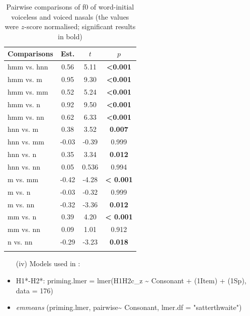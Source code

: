 \documentclass[output=paper]{langscibook}
\begin{document}
\begin{paperappendix}
\begin{table}[H]
	\robustify{\bfseries}
	\begin{tabular}{l S[table-format=-1.2] S[table-format=-1.2] S[table-format=<1.3]}
		\lsptoprule
		Comparisons & {Est.} & {$t$} & {$p$}\\\midrule
		hmm vs. hnn & 0.56 & 5.11 & \bfseries <0.001\\
		hmm vs. m & 0.95 & 9.30 & \bfseries <0.001\\
		hmm vs. mm & 0.52 & 5.24 & \bfseries <0.001\\
		hmm vs. n & 0.92 & 9.50 & \bfseries <0.001\\
		hmm vs. nn & 0.62 & 6.33 & \bfseries <0.001\\
		hnn vs. m & 0.38 & 3.52 & \bfseries 0.007\\
		hnn vs. mm & -0.03 & -0.39 & 0.999\\
		hnn vs. n & 0.35 & 3.34 & \bfseries 0.012\\
		hnn vs. nn & 0.05 & 0.536 & 0.994\\
		m vs. mm & -0.42 & -4.28 & \bfseries < 0.001\\
		m vs. n & -0.03 & -0.32 & 0.999\\
		m vs. nn & -0.32 & -3.36 & \bfseries 0.012\\
		mm vs. n & 0.39 & 4.20 & \bfseries < 0.001\\
		mm vs. nn & 0.09 & 1.01 & 0.912\\
		n vs. nn & -0.29 & -3.23 & \bfseries 0.018\\
		\lspbottomrule
	\end{tabular}
	\caption{Pairwise comparisons of f0 of word-initial voiceless and voiced nasals (the values were $z$-score normalised; significant results in bold)}
	\label{tab:13:sm3}
\end{table}

\clearpage
\begin{itemize}
\item[(iv)] Models used in :
\item
H1*-H2*:
priming.lmer = lmer(H1H2c\_z {\textasciitilde} Consonant + (1{\textbar}Item) + (1{\textbar}Sp), data = 176)
\item
\textit{emmeans} (priming.lmer, pairwise{\textasciitilde} Consonant, lmer.df = "satterthwaite")
\end{itemize}


\end{paperappendix}
\end{document}
